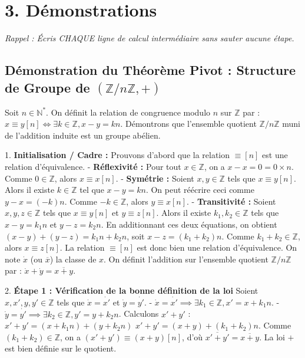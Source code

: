 \documentclass{report}
\begin{document}
\section*{3. Démonstrations}
\textit{Rappel : Écris CHAQUE ligne de calcul intermédiaire sans sauter aucune étape.}

\subsection*{Démonstration du Théorème Pivot : Structure de Groupe de $(\mathbb{Z}/n\mathbb{Z}, +)$}
Soit $n \in \mathbb{N}^*$. On définit la relation de congruence modulo $n$ sur $\mathbb{Z}$ par : $x \equiv y [n] \iff \exists k \in \mathbb{Z}, x - y = kn$.
Démontrons que l'ensemble quotient $\mathbb{Z}/n\mathbb{Z}$ muni de l'addition induite est un groupe abélien.

1. \textbf{Initialisation / Cadre :} Prouvons d'abord que la relation $\equiv [n]$ est une relation d'équivalence.
   - \textbf{Réflexivité :} Pour tout $x \in \mathbb{Z}$, on a $x - x = 0 = 0 \times n$. Comme $0 \in \mathbb{Z}$, alors $x \equiv x [n]$.
   - \textbf{Symétrie :} Soient $x, y \in \mathbb{Z}$ tels que $x \equiv y [n]$. Alors il existe $k \in \mathbb{Z}$ tel que $x - y = kn$. On peut réécrire ceci comme $y - x = (-k)n$. Comme $-k \in \mathbb{Z}$, alors $y \equiv x [n]$.
   - \textbf{Transitivité :} Soient $x, y, z \in \mathbb{Z}$ tels que $x \equiv y [n]$ et $y \equiv z [n]$. Alors il existe $k_1, k_2 \in \mathbb{Z}$ tels que $x - y = k_1n$ et $y - z = k_2n$. En additionnant ces deux équations, on obtient $(x - y) + (y - z) = k_1n + k_2n$, soit $x - z = (k_1 + k_2)n$. Comme $k_1 + k_2 \in \mathbb{Z}$, alors $x \equiv z [n]$.
   La relation $\equiv [n]$ est donc bien une relation d'équivalence. On note $\dot{x}$ (ou $\overline{x}$) la classe de $x$. On définit l'addition sur l'ensemble quotient $\mathbb{Z}/n\mathbb{Z}$ par : $\dot{x} + \dot{y} = \overline{x+y}$.

2. \textbf{Étape 1 : Vérification de la bonne définition de la loi}
   Soient $x, x', y, y' \in \mathbb{Z}$ tels que $\dot{x} = \dot{x'}$ et $\dot{y} = \dot{y'}$.
   - $\dot{x} = \dot{x'} \implies \exists k_1 \in \mathbb{Z}, x' = x + k_1 n$.
   - $\dot{y} = \dot{y'} \implies \exists k_2 \in \mathbb{Z}, y' = y + k_2 n$.
   Calculons $x' + y'$ :
   $x' + y' = (x + k_1 n) + (y + k_2 n)$
   $x' + y' = (x + y) + (k_1 + k_2) n$.
   Comme $(k_1 + k_2) \in \mathbb{Z}$, on a $(x' + y') \equiv (x + y) [n]$, d'où $\overline{x' + y'} = \overline{x + y}$.
   La loi $+$ est bien définie sur le quotient.
\end{document}
